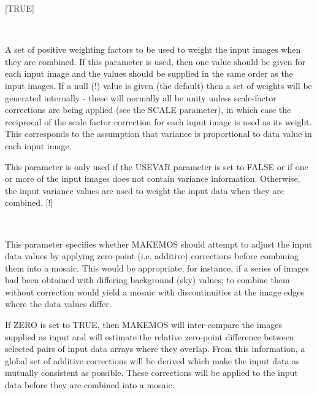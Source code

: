 \documentclass[twoside,11pt]{article}
\renewcommand{\_}{\texttt{\symbol{95}}}
\newcommand{\routine}[1]{{\sc #1}}
\newcommand{\sstsubsection}[1]{ \item[{#1}] \mbox{} \\}
\newcommand{\sstsubsection}[1]{\item[{#1}]}
\begin{document}
{{{        [TRUE]
      }
      \sstsubsection{
         WEIGHTS( ) = \_REAL (Read)
      } {
         A set of positive weighting factors to be used to weight the
         input images when they are combined. If this parameter is used,
         then one value should be given for each input image and the
         values should be supplied in the same order as the input images.
         If a null (!) value is given (the default) then a set of
         weights will be generated internally - these will normally all
         be unity unless scale-factor corrections are being applied
         (see the SCALE parameter), in which case the reciprocal of the
         scale factor correction for each input image is used as its
         weight. This corresponds to the assumption that variance is
         proportional to data value in each input image.

         This parameter is only used if the USEVAR parameter is set to
         FALSE or if one or more of the input images does not contain
         variance information. Otherwise, the input variance values are
         used to weight the input data when they are combined.
         [!]
      }
      \sstsubsection{
         ZERO = \_LOGICAL (Read)
      } {
         This parameter specifies whether \routine{MAKEMOS} should attempt to
         adjust the input data values by applying zero-point (i.e.
         additive) corrections before combining them into a mosaic.
         This would be appropriate, for instance, if a series of images
         had been obtained with differing background (sky) values; to
         combine them without correction would yield a mosaic with
         discontinuities at the image edges where the data values
         differ.

         If ZERO is set to TRUE, then \routine{MAKEMOS} will inter-compare the
         images supplied as input and will estimate the relative
         zero-point difference between selected pairs of input data
         arrays where they overlap.  From this information, a global
         set of additive corrections will be derived which make the
         input data as mutually consistent as possible. These
         corrections will be applied to the input data before they are
         combined into a mosaic.

}}}
\end{document}
